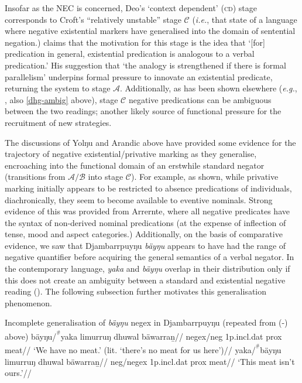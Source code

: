 Insofar as the NEC is concerned, Deo's `context dependent' (\textsc{cd}) stage corresponds to Croft's ``relatively unstable'' stage $ \mathcal C $ (\textit{i.e.}, that state of a language where negative existential markers have generalised into the domain of sentential negation.) \citet[19]{Croft1991} claims that the motivation for this stage is the idea that `[for] predication in general, existential predication is analogous to a verbal predication.' His suggestion that `the analogy is strengthened if there is formal parallelism' underpins formal pressure to innovate an existential predicate, returning the system to stage $ \mathcal A $. Additionally, as has been shown elsewhere (\textit{e.g.}, \nextx, also \ref{dhg-ambig} above), stage $ \mathcal C $ negative predications can be ambiguous between the two readings; another likely source of functional pressure for the recruitment of new strategies.

The discussions of Yolŋu and Arandic above have provided some evidence for the trajectory of negative existential/privative marking as they generalise, encroaching into the functional domain of an erstwhile standard negator (transitions from $\mathcal{A/B}$ into stage $\mathcal C$). For example, as shown, while privative marking initially appears to be restricted to absence predications of individuals, diachronically, they seem to become available to eventive nominals. Strong evidence of this was provided from Arrernte, where all negative predicates have the syntax of non-derived nominal predications (at the expense of inflection of tense, mood and aspect categories.) Additionally, on the basis of comparative evidence, we saw that Djambarrpuyŋu \textit{bäyŋu} appears to have had the range of negative quantifier before acquiring the general semantics of a verbal negator. In the contemporary language, \textit{yaka} and \textit{bäyŋu} overlap in their distribution only if this does not create an ambiguity between a standard and existential negative reading (\nextx). The following subsection further motivates this generalisation phenomenon. 


\pex Incomplete generalisation of \textit{bäyŋu} \gls{negex} in Djambarrpuyŋu (repeated from (-) above)\trailingcitation{[AW~20190505]}
\a\begingl\gla bäyŋu/\textsuperscript{$ ^\# $}yaka  limurruŋ dhuwal bäwarraṉ//
\glb \gls{negex}/\gls{neg} 1p.\gls{incl}.\gls{dat} \gls{prox} meat//
\glft `We have no meat.' (lit. `there's no meat for us here')//\endgl
\a\begingl\gla yaka/\textsuperscript{$ ^\# $}bäyŋu limurruŋ dhuwal bäwarraṉ//
\glb  \gls{neg}/\gls{negex}  1p.\gls{incl}.\gls{dat} \gls{prox} meat//
\glft`This meat isn't ours.'//\endgl
\xe

